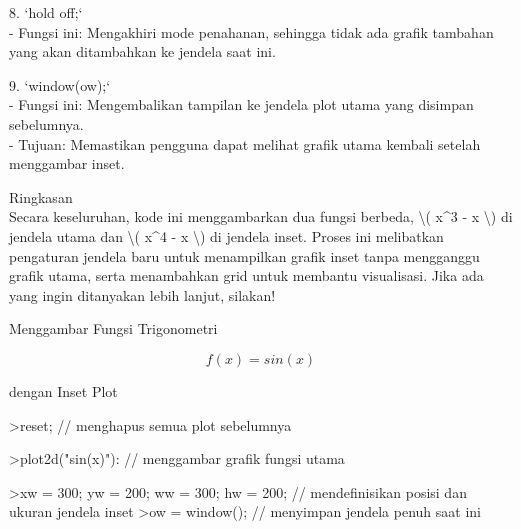 \documentclass{article}
\begin{document}
\begin{eulernotebook}
\begin{eulercomment}
\begin{eulercomment}
\begin{eulercomment}
\begin{eulercomment}
\begin{eulercomment}
8. `hold off;`\\
- Fungsi ini: Mengakhiri mode penahanan, sehingga tidak ada grafik
tambahan yang akan ditambahkan ke jendela saat ini.

9. `window(ow);`\\
- Fungsi ini: Mengembalikan tampilan ke jendela plot utama yang
disimpan sebelumnya.\\
- Tujuan: Memastikan pengguna dapat melihat grafik utama kembali
setelah menggambar inset.

Ringkasan\\
Secara keseluruhan, kode ini menggambarkan dua fungsi berbeda, \textbackslash{}( x\textasciicircum{}3
- x \textbackslash{}) di jendela utama dan \textbackslash{}( x\textasciicircum{}4 - x \textbackslash{}) di jendela inset. Proses ini
melibatkan pengaturan jendela baru untuk menampilkan grafik inset
tanpa mengganggu grafik utama, serta menambahkan grid untuk membantu
visualisasi. Jika ada yang ingin ditanyakan lebih lanjut, silakan!

\end{eulercomment}
\begin{eulercomment}
Menggambar Fungsi Trigonometri\\
\end{eulercomment}
\begin{eulerformula}
\[
f(x)=sin(x)
\]
\end{eulerformula}
\begin{eulercomment}
dengan Inset Plot

\end{eulercomment}
\begin{eulerprompt}
>reset; // menghapus semua plot sebelumnya
\end{eulerprompt}
\begin{euleroutput}
  
\end{euleroutput}
\begin{eulerprompt}
>plot2d("sin(x)"): // menggambar grafik fungsi utama
\end{eulerprompt}
\begin{eulerprompt}
>xw = 300; yw = 200; ww = 300; hw = 200; // mendefinisikan posisi dan ukuran jendela inset
>ow = window(); // menyimpan jendela penuh saat ini
\end{eulerprompt}
\begin{euleroutput}
  

\end{euleroutput}
\end{eulercomment}
\end{eulercomment}
\end{eulercomment}
\end{eulercomment}
\end{eulernotebook}
\end{document}

